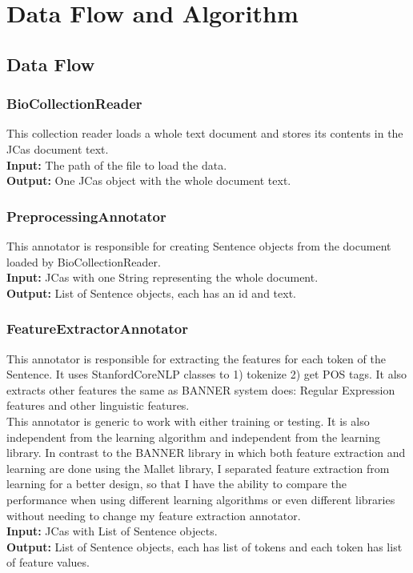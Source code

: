 \documentclass{article}
\begin{document}
\section{Data Flow and Algorithm}
\subsection{Data Flow}
\subsubsection{BioCollectionReader}
This collection reader loads a whole text document and stores its contents in the JCas document text.\\
\textbf{Input:} The path of the file to load the data.\\
\textbf{Output:} One JCas object with the whole document text.


\subsubsection{PreprocessingAnnotator}
This annotator is responsible for creating Sentence objects from the document loaded by BioCollectionReader.\\
\textbf{Input:} JCas with one String representing the whole document.\\
\textbf{Output:} List of Sentence objects, each has an id and text.\\


\subsubsection{FeatureExtractorAnnotator}
This annotator is responsible for extracting the features for each token of the Sentence. It uses StanfordCoreNLP classes to 1) tokenize 2) get POS tags. It also extracts other features the same as BANNER \cite{banner_code} system does: Regular Expression features and other linguistic features.\\
 
This annotator is generic to work with either training or testing. It is also independent from the learning algorithm and independent from the learning library. In contrast to the BANNER library in which both feature extraction and learning are done using the Mallet library, I separated feature extraction from learning for a better design, so that I have the ability to compare the performance when using different learning algorithms or even different libraries without needing to change my feature extraction annotator.\\
\textbf{Input:} JCas with List of Sentence objects.\\
\textbf{Output:} List of Sentence objects, each has list of tokens and each token has list of feature values.\\
\end{document}
